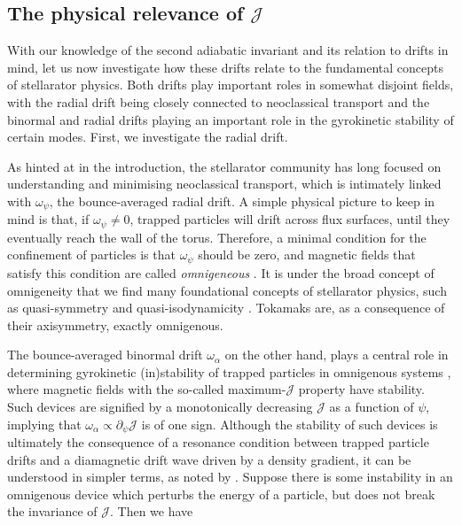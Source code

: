 \subsection{The physical relevance of $\mathcal{J}$}
With our knowledge of the second adiabatic invariant and its relation to drifts in mind, let us now investigate how these drifts relate to the fundamental concepts of stellarator physics. Both drifts play important roles in somewhat disjoint fields, with the radial drift being closely connected to neoclassical transport and the binormal and radial drifts playing an important role in the gyrokinetic stability of certain modes. First, we investigate the radial drift.  \par 
As hinted at in the introduction, the stellarator community has long focused on understanding and minimising neoclassical transport, which is intimately linked with $\omega_\psi$, the bounce-averaged radial drift. A simple physical picture to keep in mind is that, if $\omega_\psi \neq 0$, trapped particles will drift across flux surfaces, until they eventually reach the wall of the torus. Therefore, a minimal condition for the confinement of particles is that $\omega_\psi$ should be zero, and magnetic fields that satisfy this condition are called \textit{omnigeneous} \cite{catto1981omnigenous}. It is under the broad concept of omnigeneity that we find many foundational concepts of stellarator physics, such as quasi-symmetry \cite{boozer1983transport,landreman2012omnigenity,landreman2022magnetic,rodriguez2020necessary,rodriguez2022quasisymmetry} and quasi-isodynamicity \cite{nuhrenberg2010development,goodman2022constructing}. Tokamaks are, as a consequence of their axisymmetry, exactly omnigenous. \par 
The bounce-averaged binormal drift $\omega_\alpha$ on the other hand, plays a central role in determining gyrokinetic (in)stability of trapped particles in omnigenous systems \cite{rosenbluth1971finite,proll2012resilience,helander2013collisionless}, where magnetic fields with the so-called maximum-$\mathcal{J}$ property have stability. Such devices are signified by a monotonically decreasing $\mathcal{J}$ as a function of $\psi$, implying that $\omega_\alpha \propto \partial_\psi \mathcal{J}$ is of one sign. Although the stability of such devices is ultimately the consequence of a resonance condition between trapped particle drifts and a diamagnetic drift wave driven by a density gradient, it can be understood in simpler terms, as noted by \citet{helander2012stellarator}. Suppose there is some instability in an omnigenous device which perturbs the energy of a particle, but does not break the invariance of $\mathcal{J}$. Then we have
